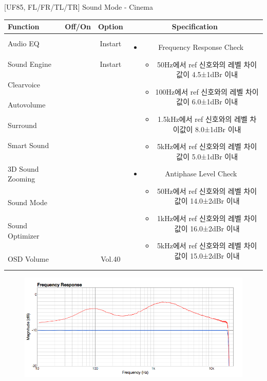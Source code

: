 \begin{frame}[t]{[UF85, FL/FR/TL/TR] Sound Mode - Cinema}
\begin{tiny}
\begin{tabular}{@{}lccc@{}}
\toprule
Function & Off/On & Option & Specification \\
\midrule
Audio EQ & \color{black}{Off} & Instart &
\multirow{10}{60mm}{
\begin{itemize}
\item Frequency Response Check
	\begin{itemize}
	\item 50Hz에서 ref 신호와의 레벨 차이값이 4.5±1dBr 이내
	\item 100Hz에서 ref 신호와의 레벨 차이값이 6.0±1dBr 이내
	\item 1.5kHz에서 ref 신호와의 레벨 차이값이 8.0±1dBr 이내
	\item 5kHz에서 ref 신호와의 레벨 차이값이 5.0±1dBr 이내
	\end{itemize}
\item Antiphase Level Check
	\begin{itemize}
	\item 50Hz에서 ref 신호와의 레벨 차이값이 14.0±2dBr 이내
	\item 1kHz에서 ref 신호와의 레벨 차이값이 16.0±2dBr 이내
	\item 5kHz에서 ref 신호와의 레벨 차이값이 15.0±2dBr 이내
	\end{itemize}
\end{itemize}
} \\
Sound Engine & \color{blue}{On} & Instart & \\
Clearvoice & \color{black}{Off} & & \\
Autovolume & \color{black}{Off} & & \\
Surround & \color{black}{Off} & & \\
Smart Sound & \color{black}{Off} & & \\
3D Sound Zooming & \color{black}{Off} & & \\
Sound Mode & \color{blue}{On} & \color{blue}{Cinema} & \\
Sound Optimizer & \color{black}{Off} & & \\
OSD Volume & \color{blue}{On} & Vol.40 & \\
\midrule
\end{tabular}
\end{tiny}

\begin{figure}[b]
\includegraphics[height=0.4\textwidth]{figures/cinema.png}
\end{figure}

\end{frame}

